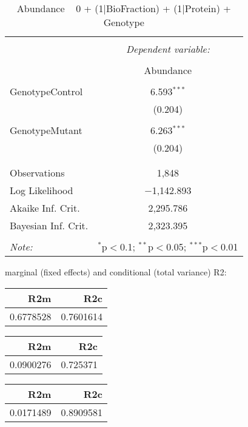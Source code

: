\documentclass[11pt]{report}
\begin{document}
\begin{table}[!htbp] \centering 
  \caption{Abundance ~ 0 + (1|BioFraction) + (1|Protein) + Genotype} 
  \label{} 
\begin{tabular}{@{\extracolsep{5pt}}lc} 
\\[-1.8ex]\hline 
\hline \\[-1.8ex] 
 & \multicolumn{1}{c}{\textit{Dependent variable:}} \\ 
\cline{2-2} 
\\[-1.8ex] & Abundance \\ 
\hline \\[-1.8ex] 
 GenotypeControl & 6.593$^{***}$ \\ 
  & (0.204) \\ 
  & \\ 
 GenotypeMutant & 6.263$^{***}$ \\ 
  & (0.204) \\ 
  & \\ 
\hline \\[-1.8ex] 
Observations & 1,848 \\ 
Log Likelihood & $-$1,142.893 \\ 
Akaike Inf. Crit. & 2,295.786 \\ 
Bayesian Inf. Crit. & 2,323.395 \\ 
\hline 
\hline \\[-1.8ex] 
\textit{Note:}  & \multicolumn{1}{r}{$^{*}$p$<$0.1; $^{**}$p$<$0.05; $^{***}$p$<$0.01} \\ 
\end{tabular} 
\end{table} 
marginal (fixed effects) and conditional (total variance) R2:

\begin{tabular}{r|r}
\hline
R2m & R2c\\
\hline
0.6778528 & 0.7601614\\
\hline
\end{tabular}

\begin{tabular}{r|r}
\hline
R2m & R2c\\
\hline
0.0900276 & 0.725371\\
\hline
\end{tabular}

\begin{tabular}{r|r}
\hline
R2m & R2c\\
\hline
0.0171489 & 0.8909581\\
\hline
\end{tabular}
\end{document}
